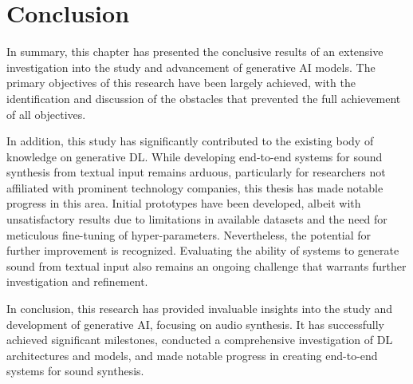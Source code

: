 \section{Conclusion} \label{sec:conc-conc}

In summary, this chapter has presented the conclusive results of an extensive investigation into the study and advancement of generative \ac{AI} models. The primary objectives of this research have been largely achieved, with the identification and discussion of the obstacles that prevented the full achievement of all objectives.

In addition, this study has significantly contributed to the existing body of knowledge on generative \ac{DL}. While developing end-to-end systems for sound synthesis from textual input remains arduous, particularly for researchers not affiliated with prominent technology companies, this thesis has made notable progress in this area. Initial prototypes have been developed, albeit with unsatisfactory results due to limitations in available datasets and the need for meticulous fine-tuning of hyper-parameters. Nevertheless, the potential for further improvement is recognized. Evaluating the ability of systems to generate sound from textual input also remains an ongoing challenge that warrants further investigation and refinement.

In conclusion, this research has provided invaluable insights into the study and development of generative \ac{AI}, focusing on audio synthesis. It has successfully achieved significant milestones, conducted a comprehensive investigation of \ac{DL} architectures and models, and made notable progress in creating end-to-end systems for sound synthesis.